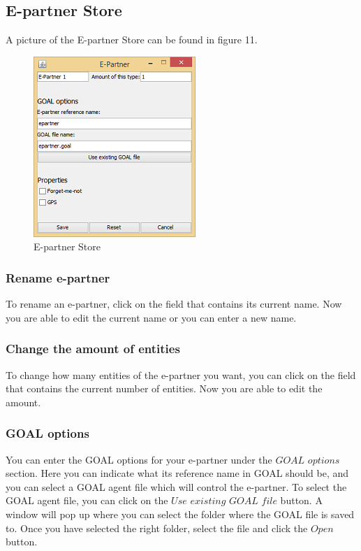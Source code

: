 \documentclass[11pt,a4paper]{article}
\begin{document}
\subsection{E-partner Store}
A picture of the E-partner Store can be found in figure 11.
\begin{figure}[h]
\begin{center}
\includegraphics{es.png}
\end{center}
\caption{E-partner Store}
\end{figure}
\subsubsection{Rename e-partner}
To rename an e-partner, click on the field that contains its current name. Now you are able to edit the current name or you can enter a new name.

\subsubsection{Change the amount of entities}
To change how many entities of the e-partner you want, you can click on the field that contains the current number of entities. Now you are able to edit the amount.

\subsubsection{GOAL options}
You can enter the GOAL options for your e-partner under the $GOAL$ $options$ section. Here you can indicate what its reference name in GOAL should be, and you can select a GOAL agent file which will control the e-partner. To select the GOAL agent file, you can click on the $Use$ $existing$ $GOAL$ $file$ button. A window will pop up where you can select the folder where the GOAL file is saved to. Once you have selected the right folder, select the file and click the $Open$ button.
\end{document}
